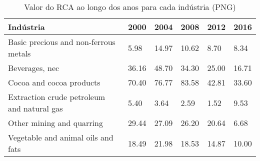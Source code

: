 \begin{table}
\centering
\caption{Valor do RCA ao longo dos anos para cada indústria (PNG)}
\begin{tabular}{p{6cm}p{1.5cm}p{1.5cm}p{1.5cm}p{1.5cm}p{1.5cm}}
\toprule
                                 Indústria &  2000 &  2004 &  2008 &  2012 &  2016 \\
\midrule
     Basic precious and non-ferrous metals &  5.98 & 14.97 & 10.62 &  8.70 &  8.34 \\
                            Beverages, nec & 36.16 & 48.70 & 34.30 & 25.00 & 16.71 \\
                  Cocoa and cocoa products & 70.40 & 76.77 & 83.58 & 42.81 & 33.60 \\
Extraction crude petroleum and natural gas &  5.40 &  3.64 &  2.59 &  1.52 &  9.53 \\
                 Other mining and quarring & 29.44 & 27.09 & 26.20 & 20.64 &  6.68 \\
        Vegetable and animal oils and fats & 18.49 & 21.98 & 18.53 & 14.87 & 10.00 \\
\bottomrule
\end{tabular}
\end{table}
